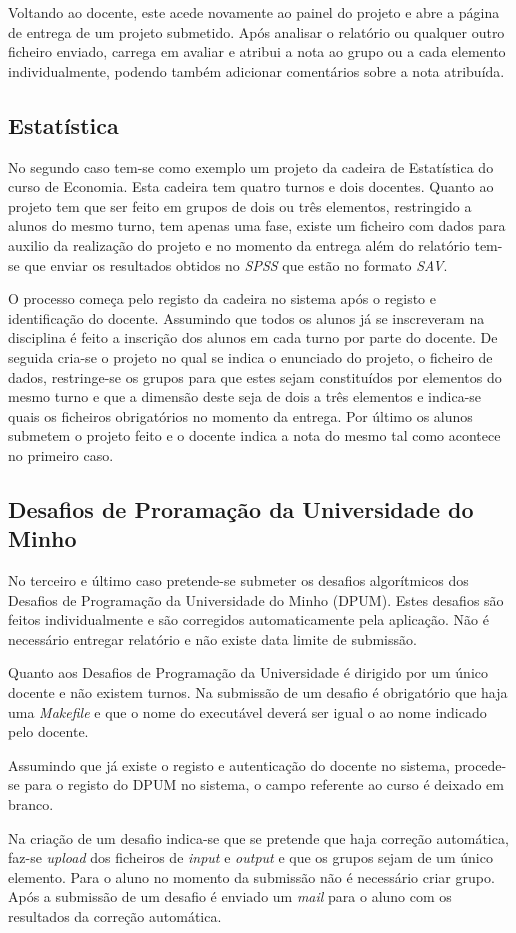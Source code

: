 Voltando ao docente, este acede novamente ao painel do projeto e abre a página de entrega de um projeto submetido. Após analisar o relatório ou qualquer outro ficheiro enviado, carrega em avaliar e atribui a nota ao grupo ou a cada elemento individualmente, podendo também adicionar comentários sobre a nota atribuída.

\subsection{Estatística}
\label{sub:estat_stica}

No segundo caso tem-se como exemplo um projeto da cadeira de Estatística do curso de Economia. Esta cadeira tem quatro turnos e dois docentes. Quanto ao projeto tem que ser feito em grupos de dois ou três elementos, restringido a alunos do mesmo turno, tem apenas uma fase, existe um ficheiro com dados para auxilio da realização do projeto e no momento da entrega além do relatório tem-se que enviar os resultados obtidos no \emph{SPSS} que estão no formato \emph{SAV}.

O processo começa pelo registo da cadeira no sistema após o registo e identificação do docente. Assumindo que todos os alunos já se inscreveram na disciplina é feito a inscrição dos alunos em cada turno por parte do docente. De seguida cria-se o projeto no qual se indica o enunciado do projeto, o ficheiro de dados, restringe-se os grupos para que estes sejam constituídos por elementos do mesmo turno e que a dimensão deste seja de dois a três elementos e indica-se quais os ficheiros obrigatórios no momento da entrega. Por último os alunos submetem o projeto feito e o docente indica a nota do mesmo tal como acontece no primeiro caso.

\subsection{Desafios de Proramação da Universidade do Minho}
\label{sub:desafios_de_prorama_o_da_universidade_do_minho}

No terceiro e último caso pretende-se submeter os desafios algorítmicos dos Desafios de Programação da Universidade do Minho (DPUM). Estes desafios são feitos individualmente e são corregidos automaticamente pela aplicação. Não é necessário entregar relatório e não existe data limite de submissão.

Quanto aos Desafios de Programação da Universidade é dirigido por um único docente e não existem turnos. Na submissão de um desafio é obrigatório que haja uma \emph{Makefile} e que o nome do executável deverá ser igual o ao nome indicado pelo docente.

Assumindo que já existe o registo e autenticação do docente no sistema, procede-se para o registo do DPUM no sistema, o campo referente ao curso é deixado em branco.

Na criação de um desafio indica-se que se pretende que haja correção automática, faz-se \emph{upload} dos ficheiros de \emph{input} e \emph{output} e que os grupos sejam de um único elemento. Para o aluno no momento da submissão não é necessário criar grupo. Após a submissão de um desafio é enviado um \emph{mail} para o aluno com os resultados da correção automática.

\newpage
